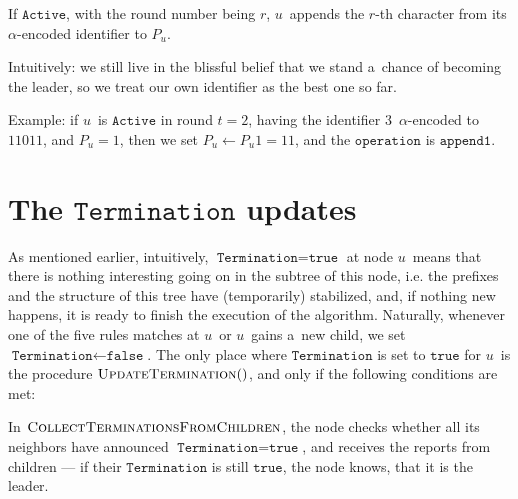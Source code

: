 \documentclass{article}
\begin{document}
If \(\texttt{Active}\), with the round number being \(r\), \(u\)~appends the \(r\)-th character from its \(\alpha\)-encoded identifier to \(P_u\).

Intuitively: we still live in the blissful belief that we stand a~chance of becoming the leader, so we treat our own identifier as the best one so far.

Example: if \(u\)~is \(\texttt{Active}\) in round \(t = 2\), having the identifier \(3\)~\(\alpha\)-encoded to \(11011\), and \(P_u = 1\), then we set \(P_u \gets P_u1 = 11\), and the \(\texttt{operation}\) is \(\texttt{append1}\).

\section{The \texorpdfstring{\(\texttt{Termination}\)}{Termination} updates}
As mentioned earlier, intuitively, \(\texttt{Termination} = \texttt{true}\) at node \(u\)~means that there is nothing interesting going on in the subtree of this node, i.e. the prefixes and the structure of this tree have (temporarily) stabilized, and, if nothing new happens, it is ready to finish the execution of the algorithm. Naturally, whenever one of the five rules matches at \(u\)~or \(u\)~gains a~new child, we set \(\texttt{Termination} \gets \texttt{false}\). The only place where \(\texttt{Termination}\) is set to \(\texttt{true}\) for \(u\)~is the procedure \(\textsc{UpdateTermination}()\), and only if the following conditions are met:
In \(\textsc{CollectTerminationsFromChildren}\), the node checks whether all its neighbors have announced \(\texttt{Termination} = \texttt{true}\), and receives the reports from children --- if their \(\texttt{Termination}\) is still \(\texttt{true}\), the node knows, that it is the leader.
\end{document}
